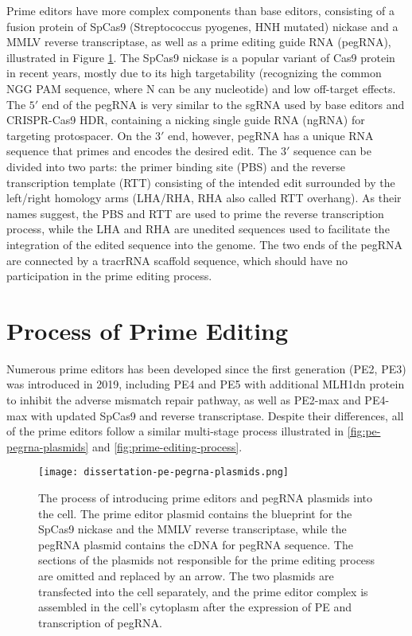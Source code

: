 Prime editors have more complex components than base editors, consisting of a fusion protein of  SpCas9 (Streptococcus pyogenes, HNH mutated) nickase and a MMLV reverse transcriptase, as well as a prime editing guide RNA (pegRNA), illustrated in Figure \ref{fig:pe-pegrna-plasmids}. The SpCas9  nickase is a popular variant of Cas9 protein in recent years, mostly due to its high targetability (recognizing the common NGG PAM sequence, where N can be any nucleotide) and low off-target effects\cite{waltonUnconstrainedGenomeTargeting2020}. The $5'$ end of the pegRNA is very similar to the sgRNA used by base editors and CRISPR-Cas9 HDR, containing a nicking single guide RNA (ngRNA) for targeting protospacer. On the $3'$ end, however, pegRNA has a unique RNA sequence that primes and encodes the desired edit. The $3'$ sequence can be divided into two parts: the primer binding site (PBS) and the reverse transcription template (RTT) consisting of the intended edit surrounded by the left/right homology arms (LHA/RHA, RHA also called RTT overhang). As their names suggest, the PBS and RTT are used to prime the reverse transcription process, while the LHA and RHA are unedited sequences used to facilitate the integration of the edited sequence into the genome. The two ends of the pegRNA are connected by a tracrRNA scaffold sequence, which should have no participation in the prime editing process. 

\section{Process of Prime Editing}

\label{sec:prime-editing-process}

Numerous prime editors has been developed since the first generation (PE2, PE3) was introduced in 2019, including PE4 and PE5 with additional MLH1dn protein to inhibit the adverse mismatch repair pathway, as well as PE2-max and PE4-max with updated SpCas9 and reverse transcriptase\cite{liuPrimeEditingPrecise2023}. Despite their differences, all of the prime editors follow a similar multi-stage process illustrated in \autoref{fig:pe-pegrna-plasmids} and \autoref{fig:prime-editing-process}. 

\begin{figure}
    \centering
    \texttt{[image: dissertation-pe-pegrna-plasmids.png]}
    \caption[Plasmids for Prime Editing]{The process of introducing prime editors and pegRNA plasmids into the cell. The prime editor plasmid contains the blueprint for the SpCas9 nickase and the MMLV reverse transcriptase, while the pegRNA plasmid contains the cDNA for pegRNA sequence. The sections of the plasmids not responsible for the prime editing process are omitted and replaced by an arrow. The two plasmids are transfected into the cell separately, and the prime editor complex is assembled in the cell's cytoplasm after the expression of PE and transcription of pegRNA.}
    \label{fig:pe-pegrna-plasmids}
\end{figure}

